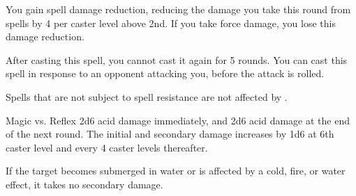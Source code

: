 \begin{spellheader}
\end{spellheader}
\begin{spellcontent}
    \begin{spelltargetinginfo}
    \end{spelltargetinginfo}
    \begin{spelleffects}
        \spelleffect You gain spell damage reduction, reducing the damage you take this round from spells by 4  per caster level above 2nd. If you take force damage, you lose this damage reduction.
    \end{spelleffects}
\end{spellcontent}
\begin{spellfooter}
    \spellnotes After casting this spell, you cannot cast it again for 5 rounds. You can cast this spell in response to an opponent attacking you, before the attack is rolled.

    Spells that are not subject to spell resistance are not affected by .
\end{spellfooter}

\begin{spellheader}
\end{spellheader}
\begin{spellcontent}
    \begin{spelltargetinginfo}
    \end{spelltargetinginfo}
    \begin{spelleffects}
        \begin{spellattack}{Magic vs. Reflex}
            \spellsuccess 2d6 acid damage immediately, and 2d6 acid damage at the end of the next round. The initial and secondary damage increases by 1d6 at 6th caster level and every 4 caster levels thereafter.
        \end{spellattack}
    \end{spelleffects}
\end{spellcontent}
\begin{spellfooter}
    \spellnotes If the target becomes submerged in water or is affected by a cold, fire, or water effect, it takes no secondary damage.
\end{spellfooter}

